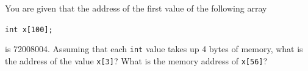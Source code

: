 You are given that the address of the first value of the following array



\verb!int x[100];!



is 72008004. Assuming that each \texttt{int} value takes up 4 bytes of memory, what is the address of the value \texttt{x[3]}? What is the memory address of \texttt{x[56]}?

